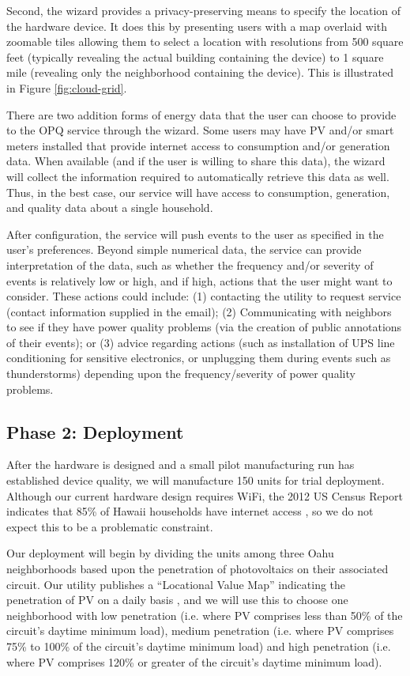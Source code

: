 Second, the wizard provides a privacy-preserving means to specify the location of the hardware device. It does this by presenting users with a map overlaid with zoomable tiles allowing them to select a location with resolutions from 500 square feet (typically revealing the actual building containing the device) to 1 square mile (revealing only the neighborhood containing the device). This is illustrated in Figure \ref{fig:cloud-grid}.

There are two addition forms of energy data that the user can choose to provide to the OPQ service through the wizard.  Some users may have PV and/or smart meters installed that provide internet access to consumption and/or generation data.  When available (and if the user is willing to share this data), the wizard will collect the information required to automatically retrieve this data as well.  Thus, in the best case, our service will have access to consumption, generation, and quality data about a single household.

After configuration, the service will push events to the user as specified in the user's preferences.  Beyond simple numerical data, the service can provide interpretation of the data, such as whether the frequency and/or severity of events is relatively low or high, and if high, actions that the user might want to consider.  These actions could include: (1) contacting the utility to request service (contact information supplied in the email); (2) Communicating with neighbors to see if they have power quality problems (via the creation of public annotations of their events); or (3) advice regarding actions (such as installation of UPS line conditioning for sensitive electronics, or unplugging them during events such as thunderstorms) depending upon the frequency/severity of power quality problems.

\subsection{Phase 2: Deployment}

After the hardware is designed and a small pilot manufacturing run has established device quality, we will manufacture 150 units for trial deployment.  Although our current hardware design requires WiFi, the 2012 US Census Report indicates that 85\% of Hawaii households have internet access \cite{home-internet-access}, so we do not expect this to be a problematic constraint. 

Our deployment will begin by dividing the units among three Oahu neighborhoods based upon the penetration of photovoltaics on their associated circuit.  Our utility publishes a ``Locational Value Map'' indicating the penetration of PV on a daily basis \cite{lvm}, and we will use this to choose one neighborhood with low penetration (i.e. where PV comprises less than 50\% of the circuit's daytime minimum load), medium penetration (i.e. where PV comprises 75\% to 100\% of the circuit's daytime minimum load) and high penetration (i.e. where PV comprises 120\% or greater of the circuit's daytime minimum load). 

